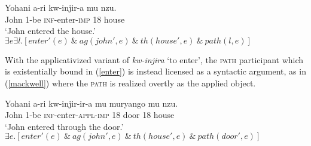 \documentclass[output=paper]{langsci/langscibook}
\begin{document}
\begin{exe}
      \ex\label{enter}\begin{xlist}
	      \ex\gll Yohani a-ri kw-injir-a mu nzu.\\
			      John 1{\sc-be} {\scshape inf-}enter-{\scshape imp} 18 house\\
			      \glt `John entered the house.'
	      \ex $\exists e\exists l.[enter'(e) \ \&\ ag(john', e)  \ \&\ th(house', e)  \ \&\ path(l,e)]$
	      \end{xlist}
	      \end{exe}
With the applicativized variant of  \emph{kw-injira} `to enter', the {\scshape path}  participant which is existentially bound in (\ref{enter}) is  instead licensed as a syntactic argument, as in (\ref{mackwell}) where  the {\scshape path}  is realized overtly as the applied object.
      \begin{exe}
      \ex\label{mackwell}\begin{xlist}
	      \ex\gll Yohani a-ri kw-injir-ir-a mu muryango mu nzu.\\
			      John 1{\sc-be} {\scshape inf-}enter-{\scshape appl-imp} 18 door 18 house\\
			      \glt `John entered through the door.'
	\ex $\exists e.[enter'(e) \ \&\ ag(john', e)  \ \&\ th(house', e)  \ \&\ path(door', e) ]$
      \end{xlist}
\end{exe}
%

\end{document}
